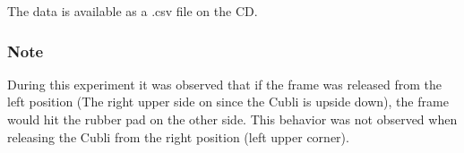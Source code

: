\begin{minipage}{\linewidth}
\begin{minipage}{0.45\linewidth}
\begin{figure}[H]
			\centering
			\vspace{-.4cm}
			\captionsetup{justification=centering}
			\label{ImpRad}
		\end{figure}\vspace{-5mm}
	\end{minipage}
\end{minipage} 

The data is available as a .csv file on the CD.

\subsubsection{Note}
During this experiment it was observed that if the frame was released from the left position (The right upper side on  since the Cubli is upside down), the frame would hit the rubber pad on the other side. This behavior was not observed when releasing the Cubli from the right position (left upper corner).


